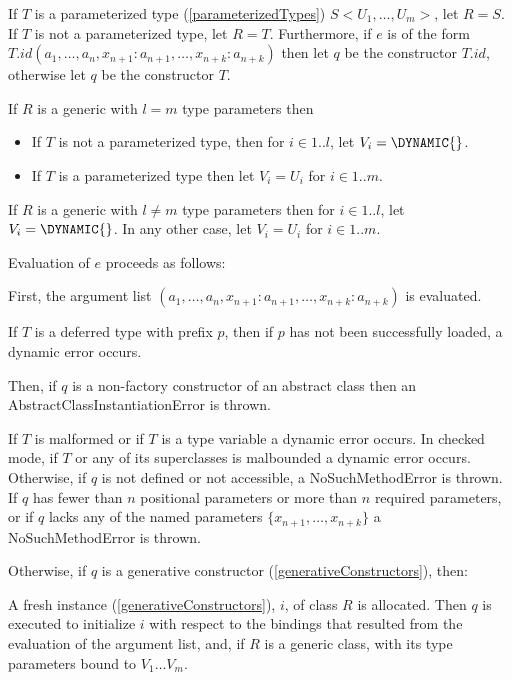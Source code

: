 \documentclass{article}
\newcommand{\code}[1]{{\sf #1}}
\begin{document}
\LMHash{}
If $T$ is a parameterized type (\ref{parameterizedTypes}) $S<U_1,  \ldots, U_m>$, let $R = S$.
If $T$ is not a parameterized type, let $R = T$.
Furthermore, if $e$ is of the form \NEW{} $T.id(a_1, \ldots , a_n, x_{n+1}: a_{n+1}, \ldots , x_{n+k}: a_{n+k})$ then let  $q$ be the constructor  $T.id$, otherwise let $q$ be the constructor $T$.

\LMHash{}
If $R$ is a generic with $l = m$ type parameters then
\begin{itemize}
\item  If $T$ is not a parameterized type, then for $ i \in 1 .. l$, let $V_i =  \DYNAMIC{}$.
\item  If $T$ is  a parameterized type then let $V_i = U_i$ for $ i \in 1 .. m$.
\end{itemize}

\LMHash{}
If $R$ is a generic with $l \ne m$ type parameters then for $ i \in 1 .. l$, let $V_i =  \DYNAMIC{}$. In any other case, let $V_i = U_i$ for $ i \in 1 .. m$.

\LMHash{}
Evaluation of $e$ proceeds as follows:

\LMHash{}
First, the argument list $(a_1, \ldots , a_n, x_{n+1}: a_{n+1}, \ldots , x_{n+k}: a_{n+k})$ is evaluated.

\LMHash{}
If $T$ is a deferred type with prefix $p$, then if $p$ has not been successfully loaded, a dynamic error occurs.

\LMHash{}
Then, if $q$ is a non-factory constructor of an abstract class then an \code{AbstractClassInstantiationError} is thrown.

\LMHash{}
If $T$ is malformed or if $T$ is a type variable a dynamic error occurs.
In checked mode, if $T$ or any of its superclasses is malbounded a dynamic error occurs.
Otherwise, if $q$ is not defined or not accessible, a \code{NoSuchMethodError} is thrown.
If $q$ has fewer than $n$ positional parameters or more than $n$ required parameters,
or if $q$ lacks any of the named parameters $\{ x_{n+1}, \ldots, x_{n+k}\}$ a \code{NoSuchMethodError} is thrown.

\LMHash{}
Otherwise, if $q$ is a generative constructor (\ref{generativeConstructors}), then:


\LMHash{}
A fresh instance (\ref{generativeConstructors}), $i$, of class $R$ is allocated.
Then $q$ is executed to initialize $i$ with respect to the bindings that resulted from the evaluation of the argument list, and, if $R$ is a generic class, with its type parameters bound to $V_1 \ldots V_m$.
\end{document}
